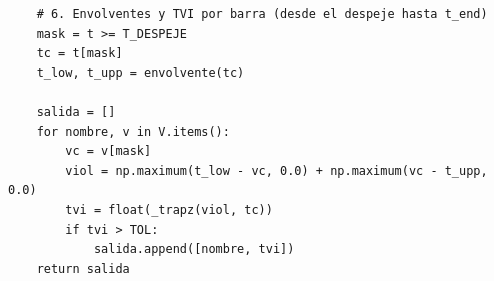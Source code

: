 \begin{lstlisting}
    # 6. Envolventes y TVI por barra (desde el despeje hasta t_end)
    mask = t >= T_DESPEJE
    tc = t[mask]
    t_low, t_upp = envolvente(tc)

    salida = []
    for nombre, v in V.items():
        vc = v[mask]
        viol = np.maximum(t_low - vc, 0.0) + np.maximum(vc - t_upp, 0.0)
        tvi = float(_trapz(viol, tc))
        if tvi > TOL:
            salida.append([nombre, tvi])
    return salida
\end{lstlisting}